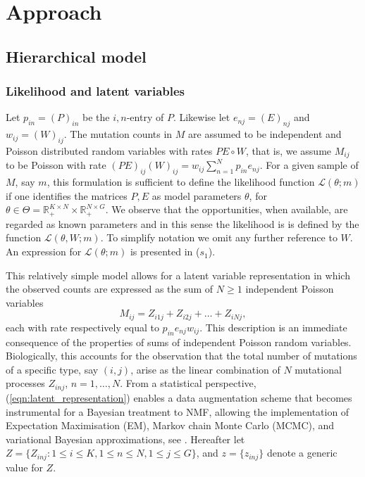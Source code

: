 \documentclass{bioinfo}
\begin{document}
\section{Approach}
\subsection{Hierarchical model}
\subsubsection{Likelihood and latent variables}
Let $p_{in} = (P)_{in}$ be the $i,n$-entry of $P$. Likewise let
$e_{nj} = (E)_{nj}$ and $w_{ij} = (W)_{ij}$.  The mutation counts in
$M$ are assumed to be independent and Poisson distributed random
variables with rates $PE\circ W$, that is, we assume $M_{ij}$ to be
Poisson with rate $(PE)_{ij}(W)_{ij} = w_{ij}\sum_{n=1}^N
p_{in}e_{nj}$. For a given sample of $M$, say $m$, this formulation is
sufficient to define the likelihood function $\mathcal L(\theta; m)$
if one identifies the matrices $P, E$ as model parameters $\theta$,
for $\theta \in \Theta = \mathbb R_+^{K\times N}\times \mathbb
R_+^{N\times G}$. We observe that the opportunities, when available,
are regarded as known parameters and in this sense the likelihood is
is  defined by the function $\mathcal L(\theta, W; m)$. To simplify 
notation we omit any further reference to $W$. An expression   
for $\mathcal L(\theta; m)$ is presented in ($s_1$).


This relatively simple model allows for a latent variable
representation in which the observed counts are expressed as the sum
of $N\geqslant 1$ independent Poisson variables
\begin{equation}
  \label{eqn:latent_representation}
   M_{ij} = Z_{i1j} + Z_{i2j} + \ldots + Z_{iNj},
\end{equation} 
each with rate respectively equal to $p_{in}e_{nj}w_{ij}$. This
description is an immediate consequence of the properties of sums of
independent Poisson random variables. Biologically, this accounts for
the observation that the total number of mutations of a specific type,
say $(i,j)$, arise as the linear combination of $N$ mutational processes
$Z_{inj}$, $n = 1, \ldots, N$. From a statistical perspective,
(\ref{eqn:latent_representation}) enables a data augmentation scheme
that becomes instrumental for a Bayesian treatment to NMF, allowing
the implementation of Expectation Maximisation (EM), Markov chain
Monte Carlo (MCMC), and variational Bayesian approximations, see
\cite{C}.  Hereafter let $Z = \{Z_{inj}: 1\leqslant i\leqslant K,
1\leqslant n \leqslant N, 1\leqslant j\leqslant G\}$, and $z =
\{z_{inj}\}$ denote a generic value for $Z$.
\end{document}
